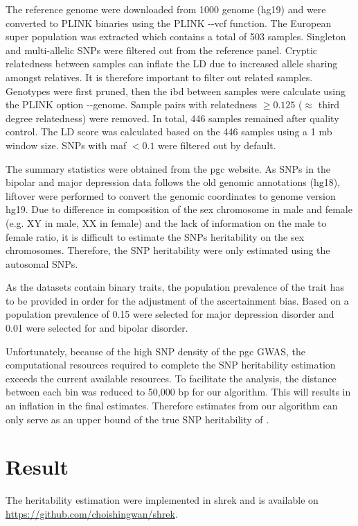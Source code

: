 	The reference genome were downloaded from 1000 genome (hg19) \citep{Project2012} and were converted to PLINK binaries using the PLINK -{}-vcf function. 
	The European super population was extracted which contains a total of 503 samples.
	Singleton and multi-allelic \glspl{SNP} were filtered out from the reference panel.	
	Cryptic relatedness between samples can inflate the \gls{LD} due to increased allele sharing amongst relatives. 
	It is therefore important to filter out related samples.
	Genotypes were first pruned, then the \gls{ibd} between samples were calculate using the PLINK option -{}-genome.
	Sample pairs with relatedness $\ge 0.125$ ($\approx$ third degree relatedness) were removed.
	In total, 446 samples remained after quality control.
	The \gls{LD} score was calculated based on the 446 samples using a 1 \gls{mb} window size.
	\glspl{SNP} with \gls{maf} $<0.1$ were filtered out by default.
	
	The summary statistics were obtained from the \gls{pgc} website. 
	As \glspl{SNP} in the bipolar and major depression data follows the old genomic annotations (hg18), liftover \citep{Hinrichs2006} were performed to convert the genomic coordinates to genome version hg19.
	Due to difference in composition of the sex chromosome in male and female (e.g. XY in male, XX in female) and the lack of information on the male to female ratio, it is difficult to estimate the \glspl{SNP} heritability on the sex chromosomes.
	Therefore, the \gls{SNP} heritability were only estimated using the autosomal \glspl{SNP}.
	
	As the datasets contain binary traits, the population prevalence of the trait has to be provided in order for the adjustment of the ascertainment bias. 
	Based on \citet{Bulik-Sullivan2015} a population prevalence of 0.15 were selected for major depression disorder and 0.01 were selected for  and bipolar disorder.
	
	Unfortunately, because of the high \gls{SNP} density of the \gls{pgc}  \gls{GWAS}, the computational resources required to complete the \gls{SNP} heritability estimation exceeds the current available resources.
	To facilitate the analysis, the distance between each bin was reduced to 50,000 \gls{bp} for our algorithm.
	This will results in an inflation in the final estimates.
	Therefore estimates from our algorithm can only serve as an upper bound of the true \gls{SNP} heritability of .
	
	\section{Result}
		The heritability estimation were implemented in \gls{shrek} and is available on \url{https://github.com/choishingwan/shrek}.  
